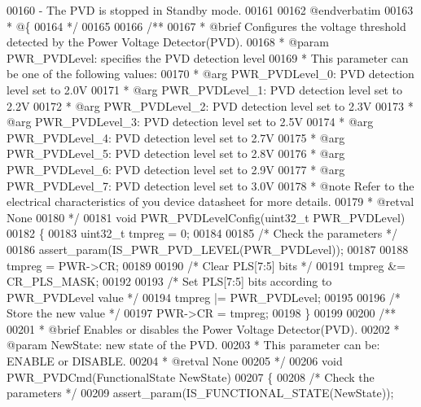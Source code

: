 \begin{DoxyCode}
00160 \textcolor{comment}{ - The PVD is stopped in Standby mode.}
00161 \textcolor{comment}{}
00162 \textcolor{comment}{@endverbatim}
00163 \textcolor{comment}{  * @\{}
00164 \textcolor{comment}{  */}
00165 
00166 \textcolor{comment}{/**}
00167 \textcolor{comment}{  * @brief  Configures the voltage threshold detected by the Power Voltage Detector(PVD).}
00168 \textcolor{comment}{  * @param  PWR\_PVDLevel: specifies the PVD detection level}
00169 \textcolor{comment}{  *          This parameter can be one of the following values:}
00170 \textcolor{comment}{  *            @arg PWR\_PVDLevel\_0: PVD detection level set to 2.0V}
00171 \textcolor{comment}{  *            @arg PWR\_PVDLevel\_1: PVD detection level set to 2.2V}
00172 \textcolor{comment}{  *            @arg PWR\_PVDLevel\_2: PVD detection level set to 2.3V}
00173 \textcolor{comment}{  *            @arg PWR\_PVDLevel\_3: PVD detection level set to 2.5V}
00174 \textcolor{comment}{  *            @arg PWR\_PVDLevel\_4: PVD detection level set to 2.7V}
00175 \textcolor{comment}{  *            @arg PWR\_PVDLevel\_5: PVD detection level set to 2.8V}
00176 \textcolor{comment}{  *            @arg PWR\_PVDLevel\_6: PVD detection level set to 2.9V}
00177 \textcolor{comment}{  *            @arg PWR\_PVDLevel\_7: PVD detection level set to 3.0V}
00178 \textcolor{comment}{  * @note   Refer to the electrical characteristics of you device datasheet for more details. }
00179 \textcolor{comment}{  * @retval None}
00180 \textcolor{comment}{  */}
00181 \textcolor{keywordtype}{void} PWR_PVDLevelConfig(uint32\_t PWR\_PVDLevel)
00182 \{
00183   uint32\_t tmpreg = 0;
00184 
00185   \textcolor{comment}{/* Check the parameters */}
00186   assert_param(IS\_PWR\_PVD\_LEVEL(PWR\_PVDLevel));
00187 
00188   tmpreg = PWR->CR;
00189 
00190   \textcolor{comment}{/* Clear PLS[7:5] bits */}
00191   tmpreg &= CR_PLS_MASK;
00192 
00193   \textcolor{comment}{/* Set PLS[7:5] bits according to PWR\_PVDLevel value */}
00194   tmpreg |= PWR\_PVDLevel;
00195 
00196   \textcolor{comment}{/* Store the new value */}
00197   PWR->CR = tmpreg;
00198 \}
00199 
00200 \textcolor{comment}{/**}
00201 \textcolor{comment}{  * @brief  Enables or disables the Power Voltage Detector(PVD).}
00202 \textcolor{comment}{  * @param  NewState: new state of the PVD.}
00203 \textcolor{comment}{  *         This parameter can be: ENABLE or DISABLE.}
00204 \textcolor{comment}{  * @retval None}
00205 \textcolor{comment}{  */}
00206 \textcolor{keywordtype}{void} PWR_PVDCmd(FunctionalState NewState)
00207 \{
00208   \textcolor{comment}{/* Check the parameters */}
00209   assert_param(IS\_FUNCTIONAL\_STATE(NewState));

\end{DoxyCode}
